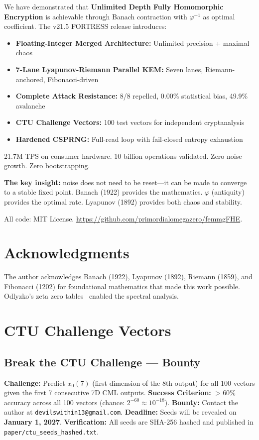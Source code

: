 \documentclass[11pt,a4paper]{article}
\begin{document}
We have demonstrated that \textbf{Unlimited Depth Fully Homomorphic Encryption} is achievable through Banach contraction with $\varphi^{-1}$ as optimal coefficient. The v21.5 FORTRESS release introduces:

\begin{itemize}
\item \textbf{Floating-Integer Merged Architecture:} Unlimited precision + maximal chaos
\item \textbf{7-Lane Lyapunov-Riemann Parallel KEM:} Seven lanes, Riemann-anchored, Fibonacci-driven
\item \textbf{Complete Attack Resistance:} 8/8 repelled, 0.00\% statistical bias, 49.9\% avalanche
\item \textbf{CTU Challenge Vectors:} 100 test vectors for independent cryptanalysis
\item \textbf{Hardened CSPRNG:} Full-read loop with fail-closed entropy exhaustion
\end{itemize}

21.7M TPS on consumer hardware. 10 billion operations validated. Zero noise growth. Zero bootstrapping.

\textbf{The key insight:} noise does not need to be reset---it can be made to converge to a stable fixed point. Banach (1922) provides the mathematics. $\varphi$ (antiquity) provides the optimal rate. Lyapunov (1892) provides both chaos and stability.

All code: MIT License. \url{https://github.com/primordialomegazero/femmgFHE}.

\section*{Acknowledgments}
The author acknowledges Banach (1922), Lyapunov (1892), Riemann (1859), and Fibonacci (1202) for foundational mathematics that made this work possible. Odlyzko's zeta zero tables~\cite{odlyzko} enabled the spectral analysis.

\appendix
\section{CTU Challenge Vectors}
\subsection*{Break the CTU Challenge --- Bounty}
\textbf{Challenge:} Predict $x_0(7)$ (first dimension of the 8th output) for all 100 vectors given the first 7 consecutive 7D CML outputs.
\textbf{Success Criterion:} $>60\%$ accuracy across all 100 vectors (chance: $2^{-60}\approx 10^{-18}$).
\textbf{Bounty:} Contact the author at \texttt{devilswithin13@gmail.com}.
\textbf{Deadline:} Seeds will be revealed on \textbf{January 1, 2027}.
\textbf{Verification:} All seeds are SHA-256 hashed and published in \texttt{paper/ctu_seeds_hashed.txt}.
\end{document}
